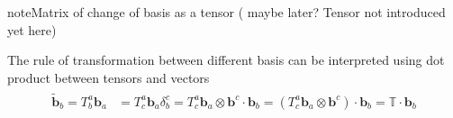 \documentclass[letterpaper,10pt,english]{jupyterBook}
\begin{document}
\begin{sphinxadmonition}{note}{Matrix of change of basis as a tensor ( maybe later? Tensor not introduced yet here)}

\sphinxAtStartPar
The rule of transformation between different basis can be interpreted using dot product between tensors and vectors
\begin{equation*}
\begin{split}\begin{aligned}
  \widetilde{\mathbf{b}}_b = T^{a}_b \mathbf{b}_a
  & = T^{a}_c \mathbf{b}_a \delta^c_b =  T^{a}_c \mathbf{b}_a \otimes \mathbf{b}^c \cdot \mathbf{b}_b = \left(  T^{a}_c \mathbf{b}_a \otimes \mathbf{b}^c \right) \cdot \mathbf{b}_b = \mathbb{T} \cdot \mathbf{b}_b \\
\end{aligned}\end{split}
\end{equation*}

\end{sphinxadmonition}
\end{document}
